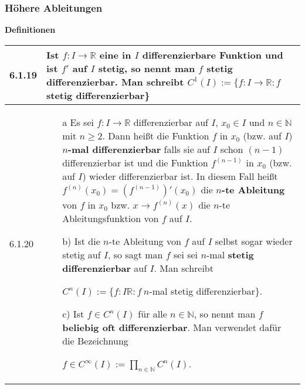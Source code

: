 \subsubsection{Höhere Ableitungen}

    \noindent
    \textbf{Definitionen}
      
    \begin{longtable}{p{1cm} p{16cm}}
        \toprule

        6.1.19& Ist $f: I \rightarrow \mathbb{R}$ eine in $I$ differenzierbare Funktion und ist $f'$ auf $I$ stetig, so nennt man
                $f$ \textbf{stetig differenzierbar}. Man schreibt $C^1(I) := \{ f:I \rightarrow \mathbb{R}: f$ stetig differenzierbar\} \\
        \midrule
        6.1.20& \begin{itemize}[topsep=-0.5cm]
                    \item[a] Es sei $f: I \rightarrow \mathbb{R}$ differenzierbar auf $I$, $x_0 \in I$ und $n \in \mathbb{N}$ mit
                                $n \geq 2$. Dann heißt die Funktion $f$ in $x_0$ (bzw. auf $I$) \textbf{$n$-mal differenzierbar}
                                falls sie auf $I$ schon $(n-1)$ differenzierbar ist und die Funktion $f^{(n-1)}$ in $x_0$
                                (bzw. auf $I$) wieder differenzierbar ist. \hfill \break
                                In diesem Fall heißt $f^{(n)}(x_0) = (f^{(n-1)})'(x_0)$ die \textbf{$n$-te Ableitung} von $f$ in
                                $x_0$ bzw. $x \rightarrow f^{(n)}(x)$ die $n$-te Ableitungsfunktion von $f$ auf $I$. 
                    \item[b)] Ist die $n$-te Ableitung von $f$ auf $I$ selbst sogar wieder stetig auf $I$, so sagt man $f$ sei
                                sei $n$-mal \textbf{stetig differenzierbar} auf $I$. Man schreibt \hfill \break
                                \centerline{$ C^n(I) := \{ f: I \mathbb{R}: f~n$-mal stetig differenzierbar\}.}
                    \item[c)] Ist $f\in C^n(I)$ für alle $n \in \mathbb{N}$, so nennt man $f$ \textbf{beliebig oft differenzierbar}.
                                Man verwendet dafür die Bezeichnung \hfill \break
                                \centerline{$f \in C^{\infty}(I) := \prod_{n \in \mathbb{N}} C^n(I)$.}
                \end{itemize} \vspace{-0cm} \\

        \bottomrule

    \end{longtable}
    

